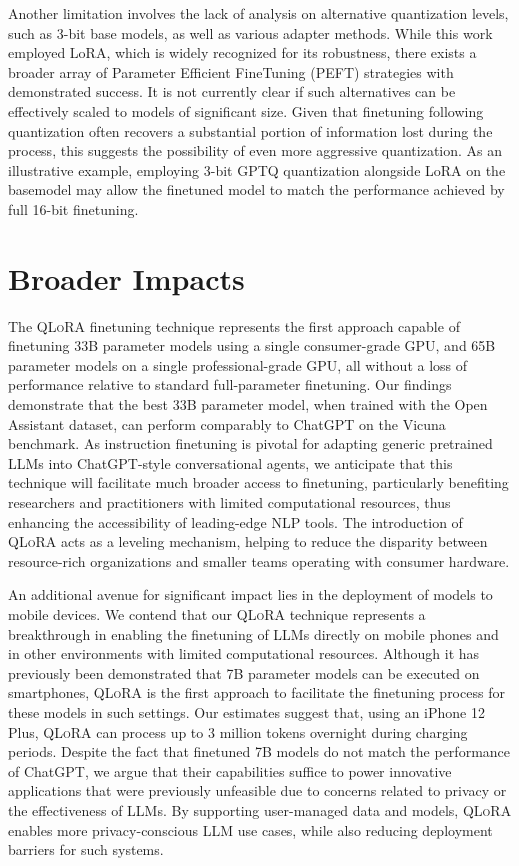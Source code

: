 Another limitation involves the lack of analysis on alternative quantization levels, such as 3-bit base models, as well as various adapter methods. While this work employed LoRA, which is widely recognized for its robustness, there exists a broader array of Parameter Efficient FineTuning (PEFT) strategies with demonstrated success. It is not currently clear if such alternatives can be effectively scaled to models of significant size. Given that finetuning following quantization often recovers a substantial portion of information lost during the process, this suggests the possibility of even more aggressive quantization. As an illustrative example, employing 3-bit GPTQ quantization alongside LoRA on the basemodel may allow the finetuned model to match the performance achieved by full 16-bit finetuning.

\section{Broader Impacts}

The \textsc{QLoRA} finetuning technique represents the first approach capable of finetuning 33B parameter models using a single consumer-grade GPU, and 65B parameter models on a single professional-grade GPU, all without a loss of performance relative to standard full-parameter finetuning. Our findings demonstrate that the best 33B parameter model, when trained with the Open Assistant dataset, can perform comparably to ChatGPT on the Vicuna benchmark. As instruction finetuning is pivotal for adapting generic pretrained LLMs into ChatGPT-style conversational agents, we anticipate that this technique will facilitate much broader access to finetuning, particularly benefiting researchers and practitioners with limited computational resources, thus enhancing the accessibility of leading-edge NLP tools. The introduction of \textsc{QLoRA} acts as a leveling mechanism, helping to reduce the disparity between resource-rich organizations and smaller teams operating with consumer hardware.

An additional avenue for significant impact lies in the deployment of models to mobile devices. We contend that our \textsc{QLoRA} technique represents a breakthrough in enabling the finetuning of LLMs directly on mobile phones and in other environments with limited computational resources. Although it has previously been demonstrated that 7B parameter models can be executed on smartphones, \textsc{QLoRA} is the first approach to facilitate the finetuning process for these models in such settings. Our estimates suggest that, using an iPhone 12 Plus, \textsc{QLoRA} can process up to 3 million tokens overnight during charging periods. Despite the fact that finetuned 7B models do not match the performance of ChatGPT, we argue that their capabilities suffice to power innovative applications that were previously unfeasible due to concerns related to privacy or the effectiveness of LLMs. By supporting user-managed data and models, \textsc{QLoRA} enables more privacy-conscious LLM use cases, while also reducing deployment barriers for such systems.

